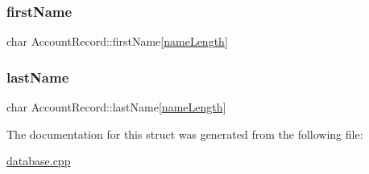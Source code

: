 \hypertarget{struct_account_record_a89df48cc152b78efda9060a0cc461dd1}{}\label{struct_account_record_a89df48cc152b78efda9060a0cc461dd1} 
\subsubsection{\texorpdfstring{first\+Name}{firstName}}
{\footnotesize\ttfamily char Account\+Record\+::first\+Name\mbox{[}\hyperlink{database_8cpp_a5d9687231dabb10b55cd7598e1be6702}{name\+Length}\mbox{]}}

\hypertarget{struct_account_record_ab9b4c37852573096dd9c81bec70f68b9}{}\label{struct_account_record_ab9b4c37852573096dd9c81bec70f68b9} 
\subsubsection{\texorpdfstring{last\+Name}{lastName}}
{\footnotesize\ttfamily char Account\+Record\+::last\+Name\mbox{[}\hyperlink{database_8cpp_a5d9687231dabb10b55cd7598e1be6702}{name\+Length}\mbox{]}}



The documentation for this struct was generated from the following file\+:\begin{DoxyCompactItemize}
\item 
\hyperlink{database_8cpp}{database.\+cpp}\end{DoxyCompactItemize}
